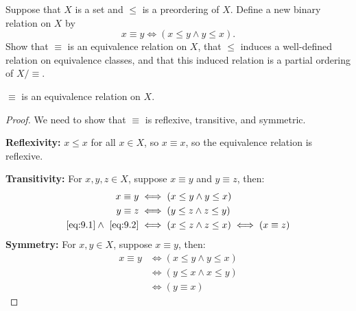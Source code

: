 \begin{problem}[9]
  Suppose that $X$ is a set and $\le$ is a preordering of $X$.
  Define a new binary relation on $X$ by
  \[ x \equiv y \iff (x \le y \land  y \le x). \]
  Show that $\equiv$ is an equivalence relation on $X$,
  that $\le$ induces a well-defined relation on equivalence classes,
  and that this induced relation is a partial ordering of $X/\equiv$.
  
\end{problem}
\begin{Answer}
  \begin{claim}
    $\equiv$ is an equivalence relation on $X$.

    \begin{proof}
      We need to show that $\equiv$ is reflexive, transitive, and symmetric.

      \step
      \textbf{Reflexivity:} $x \le x$ for all $x \in X$, so $x \equiv x$,
        so the equivalence relation is reflexive.
      
      \step
      \textbf{Transitivity:} For $x, y, z \in X$, suppose $x \equiv y$ and $y \equiv z$, then:
      \begin{align}
        x \equiv y &\iff (x \le y \land y \le x)~\label{eq:9.1} \\
        y \equiv z &\iff (y \le z \land z \le y)~\label{eq:9.2} \\
        ~\ref{eq:9.1} \land ~\ref{eq:9.2} &\iff (x \le z \land z \le x) \iff (x \equiv z)~\nonumber
      \end{align}
      \step
      \textbf{Symmetry:} For $x, y \in X$, suppose $x \equiv y$, then:
      \begin{align*}
        x \equiv y &\iff (x \le y \land y \le x) \\
        &\iff (y \le x \land x \le y) \\
        &\iff (y \equiv x)
      \end{align*}
    \end{proof}
  \end{claim}


\end{Answer}
